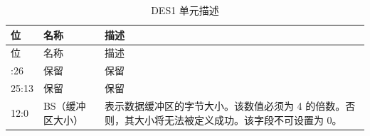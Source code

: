 
\begin{longtable}[c]{ |p{3cm}|p{4cm}|p{8cm}| }
\caption{DES1 单元描述} \label{tab:sdhost-DES1}\\
\hline
\rowcolor{lightgray}
位 &名称 & 描述 \\
\hline
\endfirsthead
\hline
\rowcolor{lightgray}
位 &名称 & 描述  \\
\hline
\endhead
\endfoot
31:26 & 保留& 保留  \\\hline
25:13 & 保留& 保留\\\hline
\multirow{3}{*}{12:0} & \multirow{3}{*}{BS（缓冲区大小）}&  表示数据缓冲区的字节大小。该数值必须为 4 的倍数。否则，其大小将无法被定义成功。该字段不可设置为 0。\\\hline
\end{longtable}

